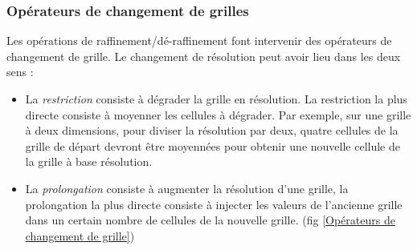 

\subsubsection{Opérateurs de changement de grilles} 
\label{Opérateurs de changement de grilles}

Les opérations de raffinement/dé-raffinement font intervenir des opérateurs de changement de grille.
Le changement de résolution peut avoir lieu dans les deux sens :

\begin{itemize}
\item La \emph{restriction} consiste à dégrader la grille en résolution. 
La restriction la plus directe consiste à moyenner les cellules à dégrader. 
Par exemple, sur une grille à deux dimensions, pour diviser la résolution par deux, quatre cellules de la grille de départ devront être moyennées pour obtenir une nouvelle cellule de la grille à base résolution.

\item La \emph{prolongation} consiste à augmenter la résolution d'une grille, la prolongation la plus directe consiste à injecter les valeurs de l'ancienne grille dans un certain nombre de cellules de la nouvelle grille. (fig \ref{Opérateurs de changement de grille})
\end{itemize}

